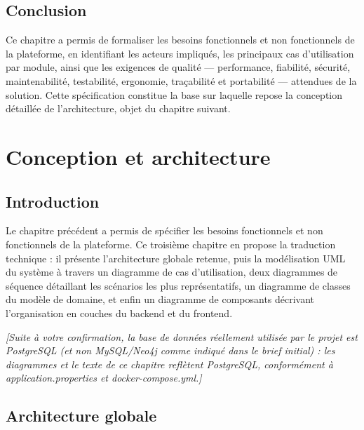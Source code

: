 \documentclass[12pt,a4paper]{report}
\newcommand{\placeholder}[1]{\par\smallskip\noindent\textcolor{placeholderred}{\itshape [#1]}\par\smallskip}
\begin{document}
\section*{Conclusion}

Ce chapitre a permis de formaliser les besoins fonctionnels et non fonctionnels de la plateforme, en identifiant les acteurs impliqués, les principaux cas d'utilisation par module, ainsi que les exigences de qualité --- performance, fiabilité, sécurité, maintenabilité, testabilité, ergonomie, traçabilité et portabilité --- attendues de la solution. Cette spécification constitue la base sur laquelle repose la conception détaillée de l'architecture, objet du chapitre suivant.

\chapter{Conception et architecture}

\section*{Introduction}

Le chapitre précédent a permis de spécifier les besoins fonctionnels et non fonctionnels de la plateforme. Ce troisième chapitre en propose la traduction technique : il présente l'architecture globale retenue, puis la modélisation UML du système à travers un diagramme de cas d'utilisation, deux diagrammes de séquence détaillant les scénarios les plus représentatifs, un diagramme de classes du modèle de domaine, et enfin un diagramme de composants décrivant l'organisation en couches du backend et du frontend.

\placeholder{Suite à votre confirmation, la base de données réellement utilisée par le projet est PostgreSQL (et non MySQL/Neo4j comme indiqué dans le brief initial) : les diagrammes et le texte de ce chapitre reflètent PostgreSQL, conformément à application.properties et docker-compose.yml.}

\section{Architecture globale}
\end{document}
